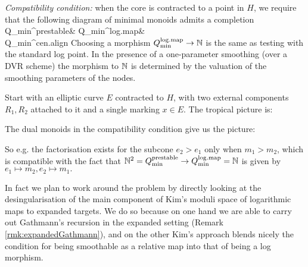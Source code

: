 \emph{Compatibility condition:} when the core is contracted to a point in $H$, we require that the following diagram of minimal monoids admits a completion
\bcd
Q_{\rm{min}}^{\rm{prestable}}\ar[r]\ar[d] & Q_{\rm{min}}^{\rm{log.map}}\ar[r,"\exists"] & \N \\
Q_{\rm{min}}^{\rm{cen.align}}
\ecd
Choosing a morphism $Q_{\rm{min}}^{\rm{log.map}}\to \N$ is the same as testing with the standard log point. In the presence of a one-parameter smoothing (over a DVR scheme) the morphism to $\N$ is determined by the valuation of the smoothing parameters of the nodes.
\begin{example}
 Start with an elliptic curve $E$ contracted to $H$, with two external components $R_1, R_2$ attached to it and a single marking $x\in E$. The tropical picture is:
\begin{center}
\end{center}
The dual monoids in the compatibility condition give us the picture:
\begin{center}
\end{center}
So e.g. the factorisation exists for the subcone $e_2>e_1$ only when $m_1>m_2$, which is compatible with the fact that $\mathbb N^2=Q_{\rm{min}}^{\rm{prestable}}\to Q_{\rm{min}}^{\rm{log.map}}=\mathbb N$ is given by
$e_1\mapsto m_2, e_2\mapsto m_1.$
\end{example}

In fact we plan to work around the problem by directly looking at the desingularisation of the main component of Kim's moduli space of logarithmic maps to expanded targets. We do so because on one hand we are able to carry out Gathmann's recursion in the expanded setting (Remark \ref{rmk:expandedGathmann}), and on the other Kim's approach blends nicely the condition for being smoothable as a relative map into that of being a log morphism.

